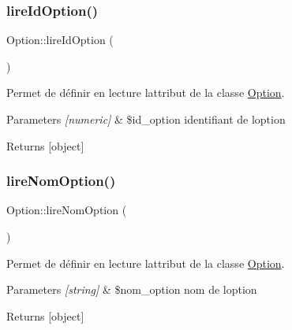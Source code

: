 \subsubsection{\texorpdfstring{lire\+Id\+Option()}{lireIdOption()}}
{\footnotesize\ttfamily Option\+::lire\+Id\+Option (\begin{DoxyParamCaption}{ }\end{DoxyParamCaption})}



Permet de définir en lecture l\textquotesingle{}attribut de la classe \hyperlink{class_option}{Option}. 


\begin{DoxyParams}{Parameters}
{\em \mbox{[}numeric\mbox{]}} & \$id\+\_\+option identifiant de l\textquotesingle{}option \\
\hline
\end{DoxyParams}
\begin{DoxyReturn}{Returns}
\mbox{[}object\mbox{]} 
\end{DoxyReturn}
\mbox{\label{class_option_a909b490d5001061c1085cd527d7e4120}} 
\subsubsection{\texorpdfstring{lire\+Nom\+Option()}{lireNomOption()}}
{\footnotesize\ttfamily Option\+::lire\+Nom\+Option (\begin{DoxyParamCaption}{ }\end{DoxyParamCaption})}



Permet de définir en lecture l\textquotesingle{}attribut de la classe \hyperlink{class_option}{Option}. 


\begin{DoxyParams}{Parameters}
{\em \mbox{[}string\mbox{]}} & \$nom\+\_\+option nom de l\textquotesingle{}option \\
\hline
\end{DoxyParams}
\begin{DoxyReturn}{Returns}
\mbox{[}object\mbox{]} 
\end{DoxyReturn}
\mbox{\label{class_option_a4ca24d327b036b6e932b396faf72486f}} 
